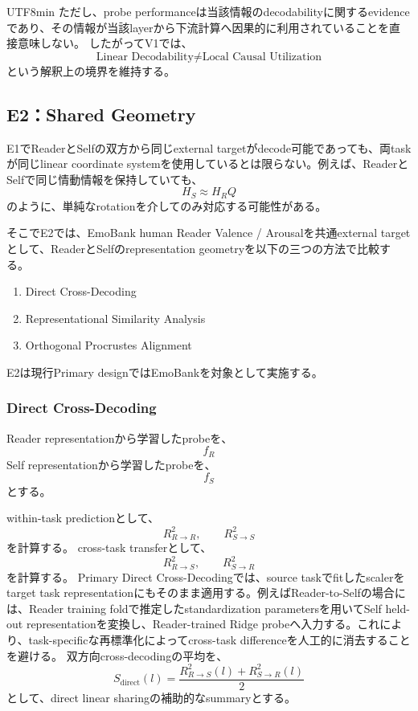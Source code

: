 \documentclass{article} %
\begin{document}
\begin{CJK*}{UTF8}{min}
ただし、probe performanceは当該情報のdecodabilityに関するevidenceであり、その情報が当該layerから下流計算へ因果的に利用されていることを直接意味しない。
したがってV1では、
\[
\text{Linear Decodability}
\neq
\text{Local Causal Utilization}
\]
という解釈上の境界を維持する。


\subsection{E2：Shared Geometry}
\label{app:v1-e2}

E1でReaderとSelfの双方から同じexternal targetがdecode可能であっても、両taskが同じlinear coordinate systemを使用しているとは限らない。例えば、ReaderとSelfで同じ情動情報を保持していても、
\[
H_S
\approx
H_RQ
\]
のように、単純なrotationを介してのみ対応する可能性がある。

そこでE2では、EmoBank human Reader Valence / Arousalを共通external targetとして、ReaderとSelfのrepresentation geometryを以下の三つの方法で比較する。
\begin{enumerate}
    \item Direct Cross-Decoding
    \item Representational Similarity Analysis\citep{kriegeskorte2008representational}
    \item Orthogonal Procrustes Alignment\citep{schonemann1966generalized}
\end{enumerate}
E2は現行Primary designではEmoBankを対象として実施する。


\subsubsection{Direct Cross-Decoding}

Reader representationから学習したprobeを、
\[
f_R
\]
Self representationから学習したprobeを、
\[
f_S
\]
とする。

within-task predictionとして、
\[
R^2_{R\rightarrow R},
\qquad
R^2_{S\rightarrow S}
\]
を計算する。
cross-task transferとして、
\[
R^2_{R\rightarrow S},
\qquad
R^2_{S\rightarrow R}
\]
を計算する。
Primary Direct Cross-Decodingでは、source taskでfitしたscalerをtarget task representationにもそのまま適用する。例えばReader-to-Selfの場合には、Reader training foldで推定したstandardization parametersを用いてSelf held-out representationを変換し、Reader-trained Ridge probeへ入力する。これにより、task-specificな再標準化によってcross-task differenceを人工的に消去することを避ける。
双方向cross-decodingの平均を、
\[
S_{\mathrm{direct}}(l)
=
\frac{
R^2_{R\rightarrow S}(l)
+
R^2_{S\rightarrow R}(l)
}{2}
\]
として、direct linear sharingの補助的なsummaryとする。



\end{CJK*}
\end{document}
